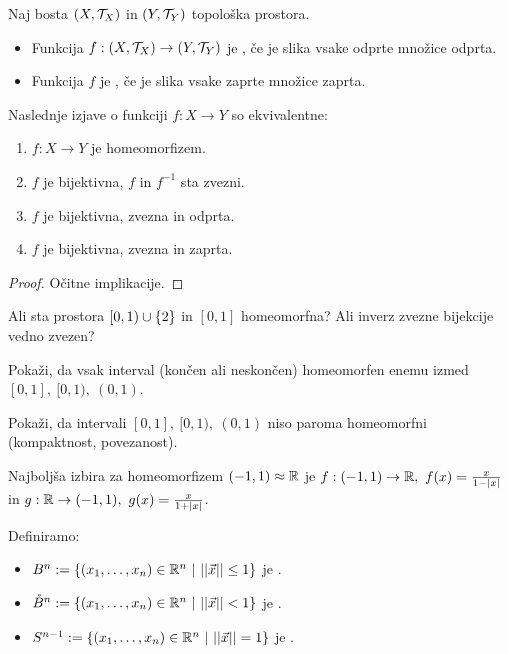 \begin{definicija}
    Naj bosta $(X, \mathcal{T}_X)$ in $(Y, \mathcal{T}_Y)$ topološka prostora.
    \begin{itemize}
        \item Funkcija $f: (X, \mathcal{T}_X) \to (Y, \mathcal{T}_Y)$ je , če je slika vsake odprte množice odprta.
        \item Funkcija $f$ je , če je slika vsake zaprte množice zaprta.
    \end{itemize}     
\end{definicija}

\begin{trditev}
    Naslednje izjave o funkciji $f: X \to Y$ so ekvivalentne:
    \begin{enumerate}
        \item $f: X \to Y$ je homeomorfizem.
        \item $f$ je bijektivna, $f$ in $f^{-1}$ sta zvezni.
        \item $f$ je bijektivna, zvezna in odprta.
        \item $f$ je bijektivna, zvezna in zaprta.
    \end{enumerate}
\end{trditev}

\begin{proof}
    Očitne implikacije.
\end{proof}

\begin{primer} 
    Ali sta prostora $[0, 1) \cup \left\{2\right\}$ in $[0,1]$ homeomorfna? Ali inverz zvezne bijekcije vedno zvezen?
\end{primer}

\begin{primer}
    Pokaži, da vsak interval (končen ali neskončen) homeomorfen enemu izmed $[0,1], \ [0, 1), \ (0,1)$.

    Pokaži, da intervali $[0,1], \ [0, 1), \ (0,1)$ niso paroma homeomorfni  (kompaktnost, povezanost).
\end{primer}

\begin{primer}
    Najboljša izbira za homeomorfizem $(-1, 1) \approx \mathbb{R}$ je $f: (-1, 1) \to \R, \ f(x) = \frac{x}{1 - |x|}$ in $g: \mathbb{R} \to (-1, 1), \ g(x) = \frac{x}{1+|x|}$.
\end{primer}

\begin{definicija} Definiramo:
    \begin{itemize}
        \item $B^n := \left\{(x_1, \ldots, x_n) \in \mathbb{R}^n \ | \ ||\vec{x}|| \leq 1\right\}$ je .
        \item $\mathring{B}^n := \left\{(x_1, \ldots, x_n) \in \mathbb{R}^n \ | \ ||\vec{x}|| < 1\right\}$ je .
        \item $S^{n-1} := \left\{(x_1, \ldots, x_n) \in \mathbb{R}^n \ | \ ||\vec{x}|| = 1\right\}$ je .
    \end{itemize}
\end{definicija}

